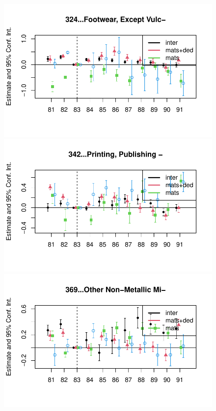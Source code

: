 \documentclass[
  12pt]{article}
\theoremstyle{definition}
\theoremstyle{remark}
\begin{document}
\begin{figure}
\begin{minipage}{\linewidth}
\includegraphics{Tax-Prod_files/figure-pdf/unnamed-chunk-11-9.pdf}

\includegraphics{Tax-Prod_files/figure-pdf/unnamed-chunk-11-10.pdf}

\includegraphics{Tax-Prod_files/figure-pdf/unnamed-chunk-11-11.pdf}


\end{minipage}
\end{figure}
\end{document}
